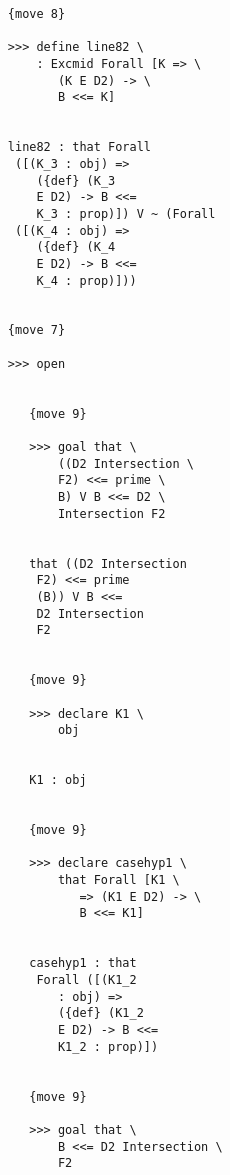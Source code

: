 \documentclass[12pt]{article}
\begin{document}
\begin{verbatim}
                        {move 8}

                        >>> define line82 \
                            : Excmid Forall [K => \
                               (K E D2) -> \
                               B <<= K]


                        line82 : that Forall 
                         ([(K_3 : obj) => 
                            ({def} (K_3 
                            E D2) -> B <<= 
                            K_3 : prop)]) V ~ (Forall 
                         ([(K_4 : obj) => 
                            ({def} (K_4 
                            E D2) -> B <<= 
                            K_4 : prop)]))


                        {move 7}

                        >>> open


                           {move 9}

                           >>> goal that \
                               ((D2 Intersection \
                               F2) <<= prime \
                               B) V B <<= D2 \
                               Intersection F2


                           that ((D2 Intersection 
                            F2) <<= prime 
                            (B)) V B <<= 
                            D2 Intersection 
                            F2


                           {move 9}

                           >>> declare K1 \
                               obj


                           K1 : obj


                           {move 9}

                           >>> declare casehyp1 \
                               that Forall [K1 \
                                  => (K1 E D2) -> \
                                  B <<= K1]


                           casehyp1 : that 
                            Forall ([(K1_2 
                               : obj) => 
                               ({def} (K1_2 
                               E D2) -> B <<= 
                               K1_2 : prop)])


                           {move 9}

                           >>> goal that \
                               B <<= D2 Intersection \
                               F2



\end{verbatim}
\end{document}
